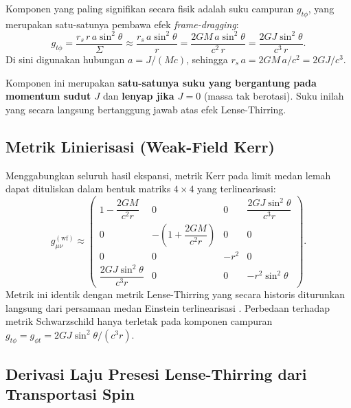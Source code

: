Komponen yang paling signifikan secara fisik adalah suku campuran $g_{t\phi}$,
yang merupakan satu-satunya pembawa efek \textit{frame-dragging}:
\begin{equation}
    g_{t\phi} = \frac{r_s\, r\, a\sin^2\!\theta}{\Sigma}
    \approx \frac{r_s\, a\sin^2\!\theta}{r}
    = \frac{2GM\,a\sin^2\!\theta}{c^2\, r}
    = \frac{2GJ\sin^2\!\theta}{c^3\, r}.
    \label{eq:gtphi-wf}
\end{equation}
Di sini digunakan hubungan $a = J/(Mc)$, sehingga $r_s\, a = 2GM\,a/c^2 = 2GJ/c^3$.

Komponen ini merupakan \textbf{satu-satunya suku yang bergantung
pada momentum sudut $J$} dan \textbf{lenyap jika $J = 0$} (massa tak berotasi).
Suku inilah yang secara langsung bertanggung jawab atas efek Lense-Thirring.


\subsection{Metrik Linierisasi (Weak-Field Kerr)}
\label{subsec:metrik-linearisasi}

Menggabungkan seluruh hasil ekspansi, metrik Kerr pada limit medan lemah
dapat dituliskan dalam bentuk matriks $4 \times 4$ yang terlinearisasi:
\begin{equation}
    g_{\mu\nu}^{(\text{wf})} \approx
    \begin{pmatrix}
        1 - \dfrac{2GM}{c^2 r} & 0 & 0 & \dfrac{2GJ\sin^2\!\theta}{c^3 r} \\[10pt]
        0 & -\!\left(1 + \dfrac{2GM}{c^2 r}\right) & 0 & 0 \\[10pt]
        0 & 0 & -r^2 & 0 \\[10pt]
        \dfrac{2GJ\sin^2\!\theta}{c^3 r} & 0 & 0 & -r^2\sin^2\!\theta
    \end{pmatrix}.
    \label{eq:kerr-wf-matrix}
\end{equation}
Metrik ini identik dengan metrik Lense-Thirring yang secara historis
diturunkan langsung dari persamaan medan Einstein terlinearisasi
\parencite{Lense1918LenseThirring}.
Perbedaan terhadap metrik Schwarzschild hanya terletak pada
komponen campuran $g_{t\phi} = g_{\phi t} = 2GJ\sin^2\!\theta/(c^3 r)$.


\subsection{Derivasi Laju Presesi Lense-Thirring dari Transportasi Spin}
\label{subsec:derivasi-lt}

